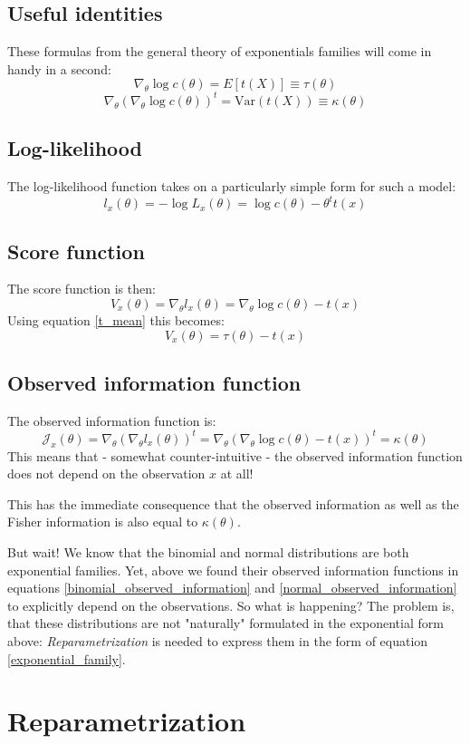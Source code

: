 \documentclass[12pt, a4paper]{article}
\numberwithin{equation}{section}
\begin{document}
\subsection{Useful identities}
These formulas from the general theory of exponentials families will come in handy in a second:
\begin{equation}
\label{t_mean}
\nabla_\theta\log c(\theta)=E[t(X)]\equiv\tau(\theta)
\end{equation}
\begin{equation}
\label{t_variance}
\nabla_\theta(\nabla_\theta \log c(\theta))^t=\textrm{Var}(t(X))\equiv\kappa(\theta)
\end{equation}

\subsection{Log-likelihood}
The log-likelihood function takes on a particularly simple form for such a model:
\begin{equation}
l_x(\theta)=-\log L_x(\theta)=\log c(\theta)-\theta^t t(x)
\end{equation}

\subsection{Score function}
The score function is then:
\begin{equation}
V_x(\theta)=\nabla_\theta l_x(\theta)=\nabla_\theta\log c(\theta)-t(x)
\end{equation}
Using equation \ref{t_mean} this becomes:
\begin{equation}
V_x(\theta)=\tau(\theta)-t(x)
\end{equation}

\subsection{Observed information function}
The observed information function is:
\begin{equation}
\mathcal{J}_x(\theta)=\nabla_\theta(\nabla_\theta l_x(\theta))^t=\nabla_\theta(\nabla_\theta \log c(\theta)-t(x))^t=\kappa(\theta)
\end{equation}
This means that - somewhat counter-intuitive - the observed information function does not depend on the observation $x$ at all!

This has the immediate consequence that the observed information as well as the Fisher information is also equal to $\kappa(\theta)$. 

But wait! We know that the binomial and normal distributions are both exponential families. Yet, above we found their observed information functions in equations \ref{binomial_observed_information} and \ref{normal_observed_information} to explicitly depend on the observations. So what is happening? The problem is, that these distributions are not "naturally" formulated in the exponential form above: \textit{Reparametrization} is needed to express them in the form of equation \ref{exponential_family}.

\section{Reparametrization}
\end{document}
